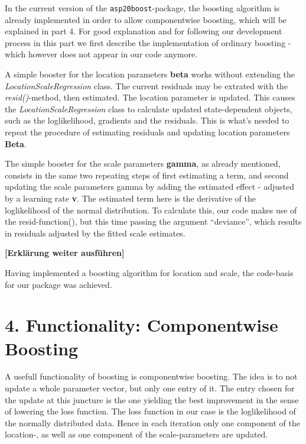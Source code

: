 \documentclass[
]{report}
\begin{document}
In the current version of the \texttt{asp20boost}-package, the boosting
algorithm is already implemented in order to allow componentwise
boosting, which will be explained in part 4. For good explanation and
for following our development process in this part we first describe the
implementation of ordinary boosting - which however does not appear in
our code anymore.

A simple booster for the location parameters \textbf{beta} works without
extending the \emph{LocationScaleRegression} class. The current
residuals may be extrated with the \emph{resid()}-method, then
estimated. The location parameter is updated. This causes the
\emph{LocationScaleRegression} class to calculate updated
state-dependent objects, such as the loglikelihood, gradients and the
residuals. This is what's needed to repeat the procedure of estimating
residuals and updating location parameters \textbf{Beta}.

The simple booster for the scale parameters \textbf{gamma}, as already
mentioned, consists in the same two repeating steps of first estimating
a term, and second updating the scale parameters gamma by adding the
estimated effect - adjusted by a learning rate \textbf{v}. The estimated
term here is the derivative of the loglikelihood of the normal
distribution. To calculate this, our code makes use of the
resid-function(), but this time passing the argument ``deviance'', which
results in residuals adjusted by the fitted scale estimates.

\textbf{{[}Erklärung weiter ausführen{]}}

Having implemented a boosting algorithm for location and scale, the
code-basis for our package was achieved.

\hypertarget{functionality-componentwise-boosting}{%
\chapter{4. Functionality: Componentwise
Boosting}\label{functionality-componentwise-boosting}}

A usefull functionality of boosting is componentwise boosting. The idea
is to not update a whole parameter vector, but only one entry of it. The
entry chosen for the update at this juncture is the one yielding the
best improvement in the sense of lowering the loss function. The loss
function in our case is the loglikelihood of the normally distributed
data. Hence in each iteration only one component of the location-, as
well as one component of the scale-parameters are updated.
\end{document}
